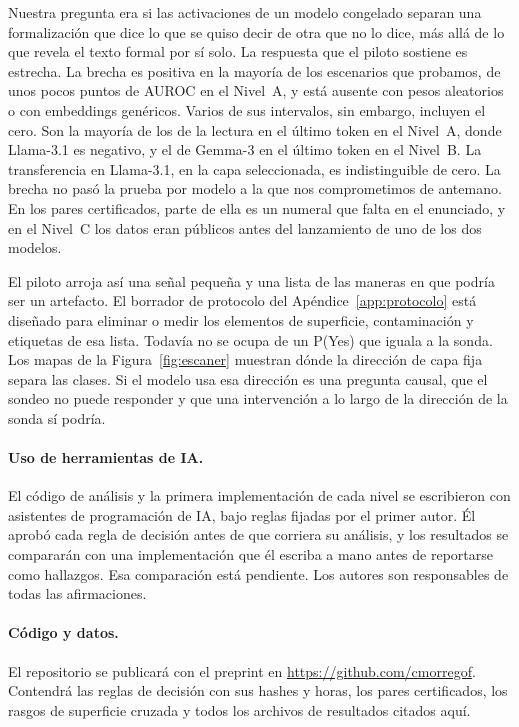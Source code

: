 \documentclass[10pt]{article}
\begin{document}
Nuestra pregunta era si las activaciones de un modelo congelado separan una formalización que dice lo que se quiso
decir de otra que no lo dice, más allá de lo que revela el texto formal por sí solo. La respuesta que el piloto
sostiene es estrecha. La brecha es positiva en la mayoría de los escenarios que probamos, de unos pocos puntos de
AUROC en el Nivel~A, y está ausente con pesos aleatorios o con embeddings genéricos. Varios de sus intervalos, sin
embargo, incluyen el cero. Son la mayoría de los de la lectura en el último token en el Nivel~A, donde Llama-3.1 es
negativo, y el de Gemma-3 en el último token en el Nivel~B. La transferencia en Llama-3.1, en la capa
seleccionada, es indistinguible de cero. La brecha no pasó la prueba por modelo a la que nos comprometimos de
antemano. En los pares certificados, parte de ella es un numeral que falta en el enunciado, y en el Nivel~C los
datos eran públicos antes del lanzamiento de uno de los dos modelos.

El piloto arroja así una señal pequeña y una lista de las maneras en que podría ser un artefacto. El borrador de
protocolo del Apéndice~\ref{app:protocolo} está diseñado para eliminar o medir los elementos de superficie,
contaminación y etiquetas de esa lista. Todavía no se ocupa de un P(Yes) que iguala a la sonda. Los mapas de la
Figura~\ref{fig:escaner} muestran dónde la dirección de capa fija separa las clases. Si el modelo usa esa dirección
es una pregunta causal, que el sondeo no puede responder y que una intervención a lo largo de la dirección de la
sonda sí podría.

\paragraph{Uso de herramientas de IA.}
El código de análisis y la primera implementación de cada nivel se escribieron con asistentes de programación de IA,
bajo reglas fijadas por el primer autor. Él aprobó cada regla de decisión antes de que corriera su análisis, y los
resultados se compararán con una implementación que él escriba a mano antes de reportarse como hallazgos. Esa
comparación está pendiente. Los autores son responsables de todas las afirmaciones.

\paragraph{Código y datos.}
El repositorio se publicará con el preprint en \url{https://github.com/cmorregof}. Contendrá las reglas de decisión
con sus hashes y horas, los pares certificados, los rasgos de superficie cruzada y todos los archivos de resultados
citados aquí.
\end{document}
